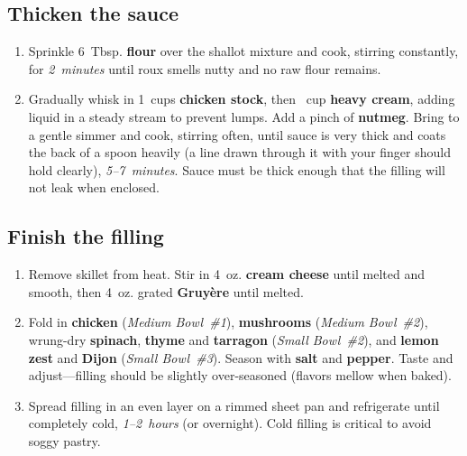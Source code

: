 \documentclass[11pt,letterpaper]{article}
\begin{document}
\subsection*{Thicken the sauce}
\begin{enumerate}
    \item Sprinkle 6~Tbsp. \textbf{flour} over the shallot mixture and cook, stirring constantly, for \textit{2~minutes} until roux smells nutty and no raw flour remains.
    \item Gradually whisk in 1~cups \textbf{chicken stock}, then ~cup \textbf{heavy cream}, adding liquid in a steady stream to prevent lumps. Add a pinch of \textbf{nutmeg}. Bring to a gentle simmer and cook, stirring often, until sauce is very thick and coats the back of a spoon heavily (a line drawn through it with your finger should hold clearly), \textit{5--7~minutes}. Sauce must be thick enough that the filling will not leak when enclosed.
\end{enumerate}

\subsection*{Finish the filling}
\begin{enumerate}
    \item Remove skillet from heat. Stir in 4~oz. \textbf{cream cheese} until melted and smooth, then 4~oz. grated \textbf{Gruyère} until melted.
    \item Fold in \textbf{chicken} (\textit{Medium Bowl~\#1}), \textbf{mushrooms} (\textit{Medium Bowl~\#2}), wrung-dry \textbf{spinach}, \textbf{thyme} and \textbf{tarragon} (\textit{Small Bowl~\#2}), and \textbf{lemon zest} and \textbf{Dijon} (\textit{Small Bowl~\#3}). Season with \textbf{salt} and \textbf{pepper}. Taste and adjust---filling should be slightly over-seasoned (flavors mellow when baked).
    \item Spread filling in an even layer on a rimmed sheet pan and refrigerate until completely cold, \textit{1--2~hours} (or overnight). Cold filling is critical to avoid soggy pastry.
\end{enumerate}
\end{document}
